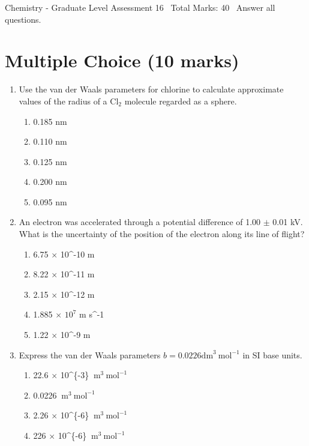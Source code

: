 \documentclass[12pt]{article}
\begin{document}
\begin{center}
Chemistry - Graduate Level Assessment 16 \
Total Marks: 40 \
Answer all questions.
\end{center}

\section*{Multiple Choice (10 marks)}
\begin{enumerate}[label=\arabic*.]
\item Use the van der Waals parameters for chlorine to calculate approximate values of the radius of a $\mathrm{Cl}_2$ molecule regarded as a sphere.
\begin{enumerate}[label=(\alph*)]
    \item 0.185 $\mathrm{nm}$
    \item 0.110 $\mathrm{nm}$
    \item 0.125 $\mathrm{nm}$
    \item 0.200 $\mathrm{nm}$
    \item 0.095 $\mathrm{nm}$
\end{enumerate}
\item An electron was accelerated through a potential difference of 1.00 \ensuremath{\pm} 0.01 kV. What is the uncertainty of the position of the electron along its line of flight?
\begin{enumerate}[label=(\alph*)]
    \item 6.75 \ensuremath{\times} 10^-10 m
    \item 8.22 \ensuremath{\times} 10^-11 m
    \item 2.15 \ensuremath{\times} 10^-12 m
    \item 1.885 \ensuremath{\times} $10^7$ m s^-1
    \item 1.22 \ensuremath{\times} 10^-9 m
\end{enumerate}
\item Express the van der Waals parameters $b=0.0226 \mathrm{dm}^3 \mathrm{~mol}^{-1}$ in SI base units.
\begin{enumerate}[label=(\alph*)]
    \item 22.6 \ensuremath{\times} 10^\{-3\} $\mathrm{~m}^3 \mathrm{~mol}^{-1}$
    \item 0.0226 $\mathrm{~m}^3 \mathrm{~mol}^{-1}$
    \item 2.26 \ensuremath{\times} 10^\{-6\} $\mathrm{~m}^3 \mathrm{~mol}^{-1}$
    \item 226 \ensuremath{\times} 10^\{-6\} $\mathrm{~m}^3 \mathrm{~mol}^{-1}$

\end{enumerate}
\end{enumerate}
\end{document}
